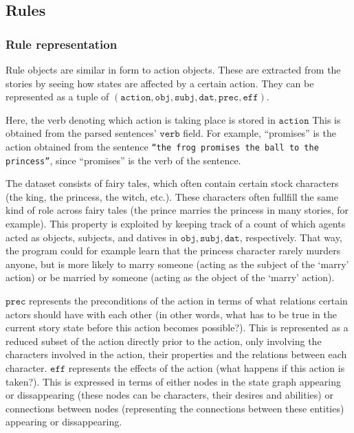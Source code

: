\subsection{Rules}

\subsubsection{Rule representation}

Rule objects are similar in form to action objects. These are extracted from 
the stories by seeing how states are affected by a certain action.
They can be represented as a tuple of $(\texttt{action}, \texttt{obj}, \texttt{subj}, \texttt{dat},
\texttt{prec}, \texttt{eff})$.

Here, the verb denoting which action is taking place is stored in 
$\texttt{action}$
This is obtained from the parsed sentences' $\texttt{verb}$ field.
For example, ``promises'' is the action obtained from the
sentence \texttt{``the frog promises the ball to the princess''}, since
``promises'' is the verb of the sentence.

The dataset consists of fairy tales, which often contain certain stock 
characters (the king, the princess, the witch, etc.). These characters often
fullfill the same kind of role across fairy tales (the prince marries the
princess in many stories, for example).
This property is exploited by keeping track of a count of which agents
acted as objects, subjects, and datives in 
$\texttt{obj}, \texttt{subj}, \texttt{dat}$, respectively. That way, the program
could for example learn that the princess character rarely murders anyone, but
is more likely to marry someone (acting as the subject of the `marry' action) or
be married by someone (acting as the object of the `marry' action).

$\texttt{prec}$ represents the preconditions of the action in terms of what 
relations certain actors should have with each other (in other words, what has
to be true in the current story state before this action becomes possible?).
This is represented as a reduced subset of the action directly prior to the
action, only involving the characters involved in the action, their properties
and the relations between each character.
$\texttt{eff}$ represents the effects of the action (what
happens if this action is taken?). This is expressed in terms of either nodes in the
state graph appearing or dissappearing (these nodes can be characters, their
desires and abilities) or connections between nodes (representing the
connections between these entities) appearing or dissappearing.

